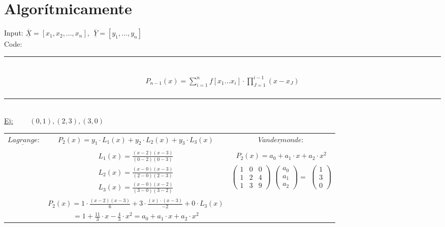 

\newpage
\section*{Algorítmicamente}
Input: $\underline {\overline{X}} = [x_{1}, x_{2}, ..., x_{n}], \ \ \underline {\overline{Y}} =[y_{1}, ..., y_{n}]$\\
Code:\\
\begin{algorithmic}[1]
\ENDFOR
{}
\ENDFOR
\ENDFOR
\end{algorithmic}


\rule{150mm}{0.1mm} \\
\begin{align*}
 P_{n-1}(x) = \sum_{i=1}^{n} f[x_{1} ... x_{i}] \cdot \prod_{J=1}^{i-1} (x-x_{J}) \\
\end{align*}
\rule{150mm}{0.1mm}\\[2\baselineskip]
\underline{Ej:} \ \ \ \ $(0,1), (2,3), (3,0)$ \\[2\baselineskip]
\begin{tabular}{cc|c}
$\underline{Lagrange}:$ &$ P_{2}(x) =  y_{1} \cdot L_{1}(x) + y_{2} \cdot L_{2}(x)+ y_{3} \cdot L_{3}(x)$ & $\underline{Vandermonde}:$ \\
& & \\
& $L_{1}(x )= \displaystyle \frac{(x-2)(x-3)}{(0-2)(0-3)}$& $P_{2}(x) = a_{0} + a_{1} \cdot x + a_{2} \cdot x^{2}$\\
 & $\begin{array}{c}
 L_{2}(x)= \displaystyle \frac{(x-0)(x-3)}{(2-0)(2-3)}\\
 L_{3}(x) = \displaystyle \frac{(x-0)(x-2)}{(3-0)(3-2)}
 \end{array}$ 
 & $\left( \begin{matrix} 1&0 &0 \\ 1 & 2 & 4  \\ 1 & 3 & 9 \end{matrix} \right)$
 $ \left( \begin{matrix} a_{0} \\ a_{1}  \\ a_{2} \end{matrix} \right) = $
 $ \left( \begin{matrix} 1 \\ 3  \\ 0 \end{matrix} \right) $\\
& $ \displaystyle P_{2}(x) = 1\cdot \frac{(x-2)(x-3)}{6}+ 3 \cdot \frac{(x) \cdot(x-3)}{-2} + 0 \cdot L_{3}(x)$ &\\
&$ \displaystyle = 1 + \frac{11}{3} \cdot x - \frac{4}{3} \cdot x^{2} = a_{0} + a_{1} \cdot x + a_{2} \cdot x^{2} $ &
\end{tabular}

